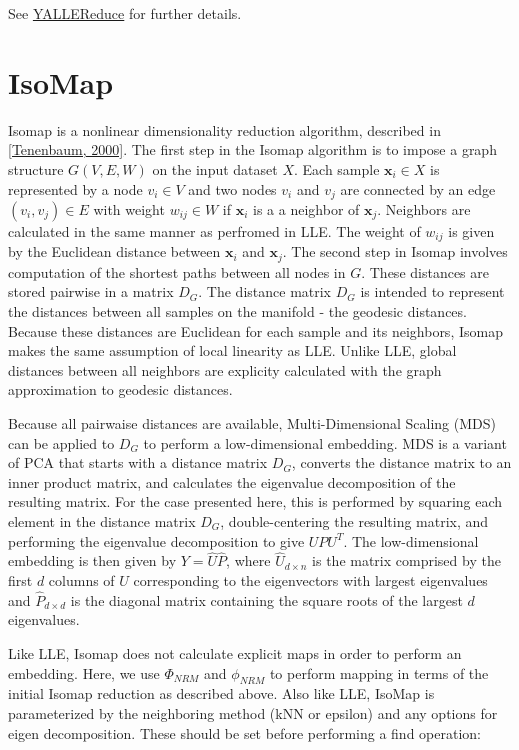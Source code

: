 See \hyperlink{class_y_a_l_l_e_reduce}{YALLEReduce} for further details.

\par
 \par
 \hypertarget{index_iso}{}\section{Iso\-Map}\label{index_iso}
Isomap is a nonlinear dimensionality reduction algorithm, described in \hyperlink{index_ref}{\mbox{[}Tenenbaum, 2000\mbox{]}}. The first step in the Isomap algorithm is to impose a graph structure $G(V,E,W)$ on the input dataset $X$. Each sample $\mathbf{x}_i\in X$ is represented by a node $v_i \in V$ and two nodes $v_i$ and $v_j$ are connected by an edge $(v_i, v_j) \in E$ with weight $w_{ij} \in W$ if $\mathbf{x}_i$ is a a neighbor of $\mathbf{x}_j$. Neighbors are calculated in the same manner as perfromed in LLE. The weight of $w_{ij}$ is given by the Euclidean distance between $\mathbf{x}_i$ and $\mathbf{x}_j$. The second step in Isomap involves computation of the shortest paths between all nodes in $G$. These distances are stored pairwise in a matrix $D_{G}$. The distance matrix $D_{G}$ is intended to represent the distances between all samples on the manifold - the geodesic distances. Because these distances are Euclidean for each sample and its neighbors, Isomap makes the same assumption of local linearity as LLE. Unlike LLE, global distances between all neighbors are explicity calculated with the graph approximation to geodesic distances.

Because all pairwaise distances are available, Multi-Dimensional Scaling (MDS) can be applied to $D_{G}$ to perform a low-dimensional embedding. MDS is a variant of PCA that starts with a distance matrix $D_G$, converts the distance matrix to an inner product matrix, and calculates the eigenvalue decomposition of the resulting matrix. For the case presented here, this is performed by squaring each element in the distance matrix $D_{G}$, double-centering the resulting matrix, and performing the eigenvalue decomposition to give $U P U^T$. The low-dimensional embedding is then given by $Y=\widehat{U} \widehat{P}$, where $\widehat{U}_{d \times n}$ is the matrix comprised by the first $d$ columns of $U$ corresponding to the eigenvectors with largest eigenvalues and $\widehat{P}_{d \times d}$ is the diagonal matrix containing the square roots of the largest $d$ eigenvalues.

Like LLE, Isomap does not calculate explicit maps in order to perform an embedding. Here, we use $\Phi_{NRM}$ and $\phi_{NRM}$ to perform mapping in terms of the initial Isomap reduction as described above. Also like LLE, Iso\-Map is parameterized by the neighboring method (k\-NN or epsilon) and any options for eigen decomposition. These should be set before performing a find operation:



